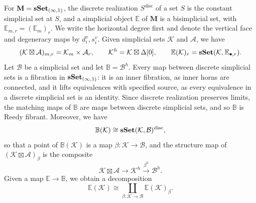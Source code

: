 \documentclass[10pt,reqno]{amsart}
\begin{document}
For $\mathbf M=\mathbf{sSet}_{(\infty,1)}$, the discrete realization
$S^{\mathrm{disc}}$ of a set $S$ is the constant simplicial set at
$S$, and a simplicial object $\mathbb E$ of $\mathbf M$ is a
bisimplicial set, with $\mathbb E_{m,r}=(\mathbb E_m)_r$. We write
the horizontal degree first and denote the vertical face and
degeneracy maps by $d_i^v,s_i^v$. Given simplicial sets
$\mathcal K$ and $\mathcal A$, we have
\[
(\mathcal K\boxtimes\mathcal A)_{m,r}=\mathcal K_m\times\mathcal A_r,
\qquad\mathcal K^h=\mathcal K\boxtimes\Delta[0],
\qquad\mathbb E(\mathcal K)_r
=\mathbf{sSet}(\mathcal K,\mathbb E_{\bullet,r}).
\]
Let $\mathcal B$ be a simplicial set and let
$\mathbb B=\mathcal B^h$. Every map between discrete simplicial sets
is a fibration in $\mathbf{sSet}_{(\infty,1)}$: it is an inner fibration, as
inner horns are connected, and it lifts equivalences with specified
source, as every equivalence in a discrete simplicial set is an
identity. Since discrete realization preserves limits, the matching
maps of $\mathbb B$ are maps between discrete simplicial sets, and
so $\mathbb B$ is Reedy fibrant. Moreover, we have
\[
\mathbb B(\mathcal K)\cong
\mathbf{sSet}(\mathcal K,\mathcal B)^{\mathrm{disc}},
\]
so that a point of $\mathbb B(\mathcal K)$ is a map
$\beta:\mathcal K\to\mathcal B$, and the structure map of
$(\mathcal K\boxtimes\mathcal A)_\beta$ is the composite
\[
\mathcal K\boxtimes\mathcal A\longrightarrow\mathcal K^h
\xrightarrow{\beta^h}\mathcal B^h.
\]
Given a map $\mathbb E\to\mathbb B$, we obtain a decomposition
\[
\mathbb E(\mathcal K)\cong
\coprod_{\beta:\mathcal K\to\mathcal B}\mathbb E(\mathcal K)_\beta.
\]
\end{document}
